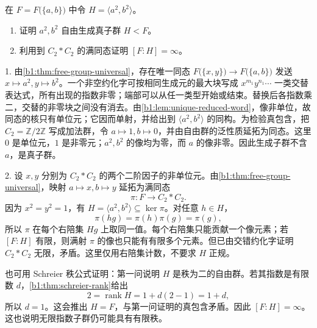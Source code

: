 \begin{exercise}\label{b1:ex:08-squares-embedding}
	在 \(F=F\bigl(\{a,b\}\bigr)\) 中令 \(H=\langle a^2,b^2\rangle\)。
	\begin{enumerate}
		\item 证明 \(a^2,b^2\) 自由生成真子群 \(H<F\)。
		\item 利用到 \(C_2*C_2\) 的满同态证明 \([F:H]=\infty\)。
	\end{enumerate}
\end{exercise}
\begin{solution}
	1. 由\cref{b1:thm:free-group-universal}，存在唯一同态 \(F\bigl(\{x,y\}\bigr)\to F\bigl(\{a,b\}\bigr)\) 发送 \(x\mapsto a^2,y\mapsto b^2\)。一个非空约化字可按相同生成元的最大块写成 \(x^{m_1}y^{n_1}\cdots\) 一类交替表达式，所有出现的指数非零；端部可以从任一类型开始或结束。替换后各指数乘二，交替的非零块之间没有消去。由\cref{b1:lem:unique-reduced-word}，像非单位，故同态的核只有单位元；它因而单射，并给出到 \(\langle a^2,b^2\rangle\) 的同构。为检验真包含，把 \(C_2=\mathbb Z/2\mathbb Z\) 写成加法群，令 \(a\mapsto1,b\mapsto0\)，并由自由群的泛性质延拓为同态。这里 \(0\) 是单位元，\(1\) 是非零元；\(a^2,b^2\) 的像均为零，而 \(a\) 的像非零。因此生成子群不含 \(a\)，是真子群。

	2. 设 \(x,y\) 分别为 \(C_2*C_2\) 的两个二阶因子的非单位元。由\cref{b1:thm:free-group-universal}，映射 \(a\mapsto x,b\mapsto y\) 延拓为满同态
	\[
		\pi:F\longrightarrow C_2*C_2.
	\]
	因为 \(x^2=y^2=1\)，有 \(H=\langle a^2,b^2\rangle\subseteq\ker\pi\)。对任意 \(h\in H\)，
	\[
		\pi(hg)=\pi(h)\pi(g)=\pi(g),
	\]
	所以 \(\pi\) 在每个右陪集 \(Hg\) 上取同一值。每个右陪集只能贡献一个像元素；若 \([F:H]\) 有限，则满射 \(\pi\) 的像也只能有有限多个元素。但已由交错约化字证明 \(C_2*C_2\) 无限，矛盾。这里仅用右陪集计数，不要求 \(H\) 正规。

	也可用 Schreier 秩公式证明：第一问说明 \(H\) 是秩为二的自由群。若其指数是有限数 \(d\)，\cref{b1:thm:schreier-rank}给出
	\[
		2=\operatorname{rank}H=1+d(2-1)=1+d,
	\]
	所以 \(d=1\)。这会推出 \(H=F\)，与第一问证明的真包含矛盾。因此 \([F:H]=\infty\)。这也说明无限指数子群仍可能具有有限秩。
\end{solution}


